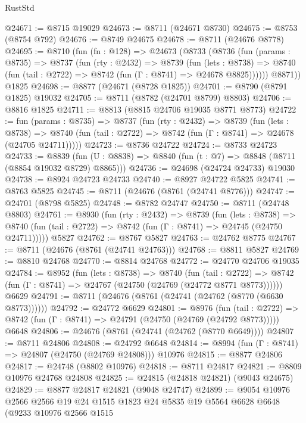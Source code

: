 \begin{lexlean}{RustStd}
\begin{coremodule}
@24671 := @8715 @19029
@24673 := @8711 (@24671 @8730)
@24675 := @8753 (@8754 @792)
@24676 := @8749 @24675
@24678 := @8711 (@24676 @8778)
@24695 := @8710
    (fun (fn : @128) =>
    @24673
      (@8733
        (@8736
          (fun (params : @8735) =>
          @8737
            (fun (rty : @2432) =>
            @8739
              (fun (lets : @8738) =>
              @8740 (fun (tail : @2722) => @8742 (fun (Γ : @8741) => @24678 @8825))))))
        @8871))
    @1825
@24698 := @8877 (@24671 (@8728 @1825))
@24701 := @8790 (@8791 @1825) @19032
@24705 := @8711 (@8782 (@24701 @8799) @8803)
@24706 := @8816 @1825
@24711 := @8813 (@8815 @24706 @19035 @8771 @8773)
@24722 := fun (params : @8735) =>
  @8737
    (fun (rty : @2432) =>
    @8739
      (fun (lets : @8738) =>
      @8740 (fun (tail : @2722) => @8742 (fun (Γ : @8741) => @24678 (@24705 @24711)))))
@24723 := @8736 @24722
@24724 := @8733 @24723
@24733 := @8839
    (fun (U : @8838) => @8840 (fun (t : @7) => @8848 (@8711 (@8854 @19032 @8729) @8865)))
@24736 := @24698 (@24724 @24733) @19030
@24738 := @8924 @24723 @24733
@24740 := @8927 @24722 @5825
@24741 := @8763 @5825
@24745 := @8711 (@24676 (@8761 (@24741 @8776)))
@24747 := @24701 (@8798 @5825)
@24748 := @8782 @24747
@24750 := @8711 (@24748 @8803)
@24761 := @8930
    (fun (rty : @2432) =>
    @8739
      (fun (lets : @8738) =>
      @8740 (fun (tail : @2722) => @8742 (fun (Γ : @8741) => @24745 (@24750 @24711)))))
    @5827
@24762 := @8767 @5827
@24763 := @24762 @8775
@24767 := @8711 (@24676 (@8761 (@24741 @24763)))
@24768 := @8811 @5827
@24769 := @8810 @24768
@24770 := @8814 @24768
@24772 := @24770 @24706 @19035
@24784 := @8952
    (fun (lets : @8738) =>
    @8740
      (fun (tail : @2722) =>
      @8742 (fun (Γ : @8741) => @24767 (@24750 (@24769 (@24772 @8771 @8773))))))
    @6629
@24791 := @8711 (@24676 (@8761 (@24741 (@24762 (@8770 (@6630 @8773))))))
@24792 := @24772 @6629
@24801 := @8976
    (fun (tail : @2722) => @8742 (fun (Γ : @8741) => @24791 (@24750 (@24769 (@24792 @8773)))))
    @6648
@24806 := @24676 (@8761 (@24741 (@24762 (@8770 @6649))))
@24807 := @8711 @24806
@24808 := @24792 @6648
@24814 := @8994 (fun (Γ : @8741) => @24807 (@24750 (@24769 @24808))) @10976
@24815 := @8877 @24806
@24817 := @24748 (@8802 @10976)
@24818 := @8711 @24817
@24821 := @8809 @10976 @24768 @24808
@24825 := @24815 (@24818 @24821) (@9043 @24675)
@24829 := @8877 @24817 @24821 (@9048 @24747)
@24899 := @9054
    @10976
    @2566
    @2566
    @19
    @24
    @1515
    @1823
    @24
    @5835
    @19
    @5564
    @6628
    @6648
    (@9233
      @10976
      @2566
      @1515

\end{coremodule}
\end{lexlean}
